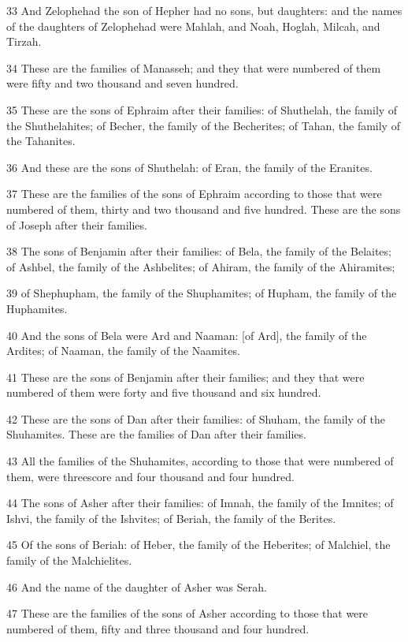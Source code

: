 \par 33 And Zelophehad the son of Hepher had no sons, but daughters: and the names of the daughters of Zelophehad were Mahlah, and Noah, Hoglah, Milcah, and Tirzah.
\par 34 These are the families of Manasseh; and they that were numbered of them were fifty and two thousand and seven hundred.
\par 35 These are the sons of Ephraim after their families: of Shuthelah, the family of the Shuthelahites; of Becher, the family of the Becherites; of Tahan, the family of the Tahanites.
\par 36 And these are the sons of Shuthelah: of Eran, the family of the Eranites.
\par 37 These are the families of the sons of Ephraim according to those that were numbered of them, thirty and two thousand and five hundred. These are the sons of Joseph after their families.
\par 38 The sons of Benjamin after their families: of Bela, the family of the Belaites; of Ashbel, the family of the Ashbelites; of Ahiram, the family of the Ahiramites;
\par 39 of Shephupham, the family of the Shuphamites; of Hupham, the family of the Huphamites.
\par 40 And the sons of Bela were Ard and Naaman: [of Ard], the family of the Ardites; of Naaman, the family of the Naamites.
\par 41 These are the sons of Benjamin after their families; and they that were numbered of them were forty and five thousand and six hundred.
\par 42 These are the sons of Dan after their families: of Shuham, the family of the Shuhamites. These are the families of Dan after their families.
\par 43 All the families of the Shuhamites, according to those that were numbered of them, were threescore and four thousand and four hundred.
\par 44 The sons of Asher after their families: of Imnah, the family of the Imnites; of Ishvi, the family of the Ishvites; of Beriah, the family of the Berites.
\par 45 Of the sons of Beriah: of Heber, the family of the Heberites; of Malchiel, the family of the Malchielites.
\par 46 And the name of the daughter of Asher was Serah.
\par 47 These are the families of the sons of Asher according to those that were numbered of them, fifty and three thousand and four hundred.
